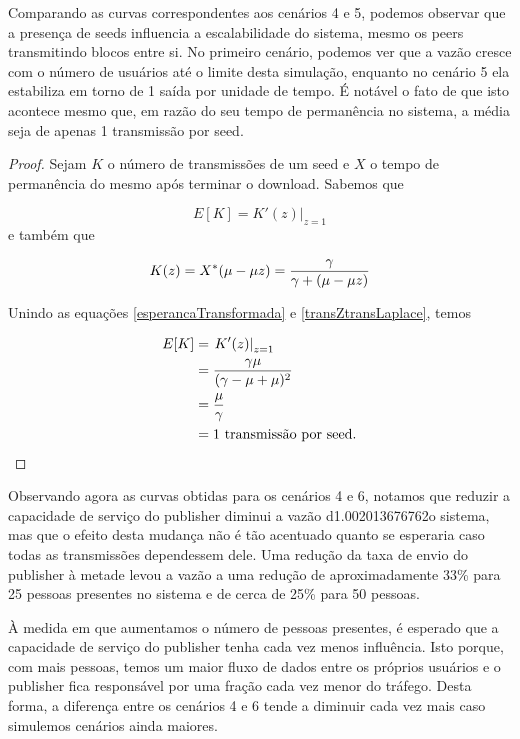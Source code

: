 \documentclass[a4paper,10pt]{article}
\begin{document}
Comparando as curvas correspondentes aos cenários 4 e 5, podemos observar que a presença de seeds influencia a escalabilidade do sistema, mesmo os peers transmitindo blocos entre si. No primeiro cenário, podemos ver que a vazão cresce com o número de usuários até o limite desta simulação, enquanto no cenário 5 ela estabiliza em torno de 1 saída por unidade de tempo. É notável o fato de que isto acontece mesmo que, em razão do seu tempo de permanência no sistema, a média seja de apenas 1 transmissão por seed.

\begin{proof}

Sejam $K$ o número de transmissões de um seed e $X$ o tempo de permanência do mesmo após terminar o download. Sabemos que

\begin{equation}\label{esperancaTransformada}
	E[K] =\left. K'(z) \right |_{z = 1}
\end{equation}
e também que

\begin{equation}\label{transZtransLaplace}
	K(z) = X^*(\mu - \mu z) = {{\gamma} \over {\gamma + (\mu - \mu z)}}
\end{equation}

Unindo as equações \ref{esperancaTransformada} e \ref{transZtransLaplace}, temos

\begin{align}
	E[K] &= \left. K'(z) \right |_{z = 1} \\
	&= {{\gamma \mu} \over {(\gamma - \mu + \mu)^2}} \\
	&= {{\mu} \over {\gamma}} \\
	&= 1 \text{ transmissão por seed.}
\end{align}
\end{proof}

Observando agora as curvas obtidas para os cenários 4 e 6, notamos que reduzir a capacidade de serviço do publisher diminui a vazão d1.002013676762o sistema, mas que o efeito desta mudança não é tão acentuado quanto se esperaria caso todas as transmissões dependessem dele. Uma redução da taxa de envio do publisher à metade levou a vazão a uma redução de aproximadamente 33\% para 25 pessoas presentes no sistema e de cerca de 25\% para 50 pessoas.

À medida em que aumentamos o número de pessoas presentes, é esperado que a capacidade de serviço do publisher tenha cada vez menos influência. Isto porque, com mais pessoas, temos um maior fluxo de dados entre os próprios usuários e o publisher fica responsável por uma fração cada vez menor do tráfego. Desta forma, a diferença entre os cenários 4 e 6 tende a diminuir cada vez mais caso simulemos cenários ainda maiores.
\end{document}
